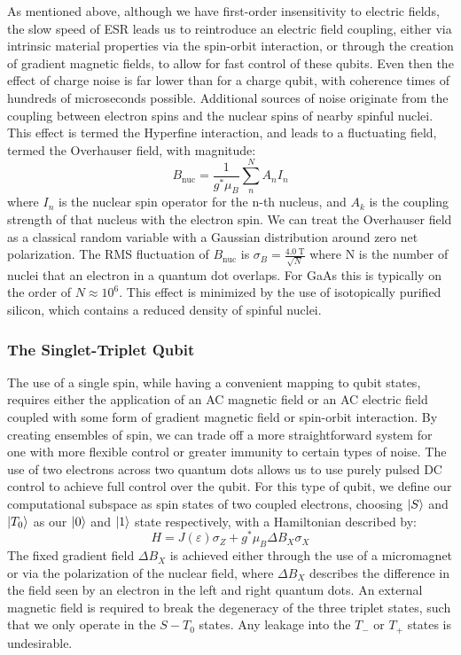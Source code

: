 As mentioned above, although we have first-order insensitivity to electric fields, the slow speed of ESR leads us to
reintroduce an electric field coupling, either via intrinsic material properties via the spin-orbit interaction, or through
the creation of gradient magnetic fields, to allow for fast control of these qubits. Even then the effect of charge noise
is far lower than for a charge qubit, with coherence times of hundreds of microseconds possible. Additional sources
of noise originate from the coupling between electron spins and the nuclear spins of nearby spinful nuclei. This
effect is termed the Hyperfine interaction, and leads to a fluctuating field, termed the Overhauser field, with magnitude:
\begin{equation}
  B_{\textrm{nuc}} = \frac{1}{g^* \mu_B} \sum^N_n A_nI_n
\end{equation}
where $I_n$ is the nuclear spin operator for the n-th nucleus, and $A_k$ is the coupling strength of that nucleus with the
electron spin. We can treat the Overhauser field as a classical random variable with a Gaussian distribution around zero net
polarization. The RMS fluctuation of $B_{\textrm{nuc}}$ is $\sigma_B = \tfrac{\SI{4.0}{\tesla}}{\sqrt{N}}$ where N is the number of
nuclei that an electron in a quantum dot overlaps\cite{PhysRevB.76.035315}. For GaAs this is typically on the order of $N \approx 10^6$.
This effect is minimized by the use of isotopically purified silicon\cite{itoh_watanabe_2014}, which contains a
reduced density of spinful nuclei.

\subsubsection{The Singlet-Triplet Qubit}
The use of a single spin, while having a convenient mapping to qubit states, requires either the application of an AC magnetic field
or an AC electric field coupled with some form of gradient magnetic field or spin-orbit interaction. By creating ensembles of
spin, we can trade off a more straightforward system for one with more flexible control or greater immunity to certain types of noise.
The use of two electrons across two quantum dots allows us to use purely pulsed DC control to achieve full control
over the qubit. For this type of qubit, we define our computational subspace as spin states of two coupled electrons, choosing
$\ket{S}$ and $\ket{T_0}$ as our $\ket{0}$ and $\ket{1}$ state respectively, with a Hamiltonian described by:
\begin{equation}
  H = J(\varepsilon)\sigma_Z + g^* \mu_B \Delta B_X \sigma_X
\end{equation}
The fixed gradient field $\Delta B_X$ is achieved either through the use of a micromagnet or via the polarization of the nuclear
field\cite{PhysRevLett.105.216803}, where $\Delta B_X$ describes the difference in the field seen by an electron in the left and
right quantum dots. An external magnetic field is required to break the degeneracy of the three triplet states, such that
we only operate in the $S-T_0$ states. Any leakage into the $T_-$ or $T_+$ states is undesirable.

